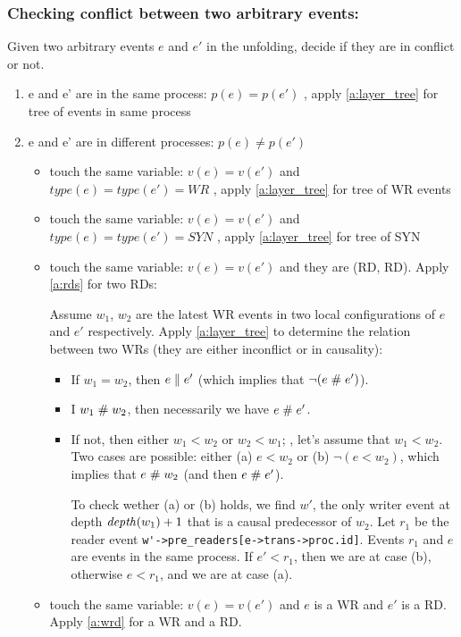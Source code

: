 \documentclass{llncs}
\begin{document}
\subsubsection{Checking conflict between two arbitrary events:}
Given two arbitrary events $e$ and $e'$ in the unfolding, decide if they are in conflict or not.
\begin{enumerate}
	\item e and e' are in the same process: $p(e) = p(e')$ , apply \cref{a:layer_tree} for tree of events in same process
	\item e and e' are in different processes: $p(e)\neq p(e')$
		\begin{itemize}
			\item
				touch the same variable: $v(e) = v(e')$ and $ type(e) = type(e') = WR$ , apply 
				\cref{a:layer_tree} for tree of WR events 
			\item
				touch the same variable: $v(e) = v(e')$ and $ type(e) = type(e') = SYN$ , apply 
				\cref{a:layer_tree} for tree of SYN
			\item
				touch the same variable: $v(e) = v(e')$ and they are (RD, RD). Apply \cref{a:rds}
				for two RDs: 
				
				 Assume $w_1$, $w_2$ are the latest WR events in two local configurations of $e$
				 and $e'$ respectively. Apply \cref{a:layer_tree} to determine the relation
				 between two WRs (they are either inconflict or in causality):
			\begin{itemize}
				\item
					If $w_1 = w_2$, then $e \mathrel{\parallel} e'$ (which implies that $\lnot (e \mathrel{\#} e')$).
				\item
					I $w_1 \mathrel{\#} w_2$, then necessarily we have $e \mathrel{\#} e'$.
				\item
					If not, then either $w_1 < w_2$ or $w_2 < w_1$; \wlogg, let's assume that $w_1 < w_2$.
					Two cases are possible: either (a) $e < w_2$ or (b) $\lnot (e < w_2)$, which implies that $e \mathrel{\#} w_2$
					(and then $e \mathrel{\#} e'$).
					
					To check wether (a) or (b) holds, we find $w'$,
					the only writer event at depth $\mathop{\mathit{depth}} (w_1) + 1$ that is a causal predecessor of $w_2$.
					Let $r_1$ be the reader event 
					\verb!w'->pre_readers[e->trans->proc.id]!. Events $r_1$ and $e$ are events in the same process.
					If $ e' < r_1$, then we are at case (b), otherwise $e < r_1$, and we are at case (a).
			\end{itemize}
			\item 
				touch the same variable: $v(e) = v(e')$ and $e$ is a WR and $e'$ is a RD. Apply
				 \cref{a:wrd} for a WR and a RD.
				

\end{itemize}
\end{enumerate}
\end{document}
